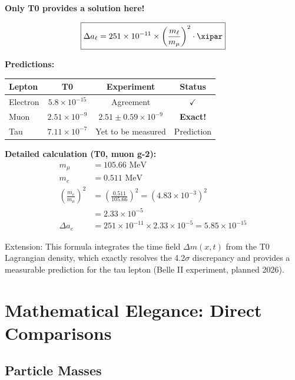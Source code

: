 	\begin{vorteil}
		\textbf{Only T0 provides a solution here!}
		
		\begin{equation}
			\boxed{\Delta a_\ell = 251 \times 10^{-11} \times \left( \frac{m_\ell}{m_\mu} \right)^2 \cdot \xipar}
		\end{equation}
		
		\textbf{Predictions:}
		\begin{center}
			\begin{tabular}{lccc}
				\toprule
				\textbf{Lepton} & \textbf{T0} & \textbf{Experiment} & \textbf{Status} \\
				\midrule
				Electron & $5.8 \times 10^{-15}$ & Agreement & $\checkmark$ \\
				Muon & $2.51 \times 10^{-9}$ & $2.51 \pm 0.59 \times 10^{-9}$ & \textbf{Exact!} \\
				Tau & $7.11 \times 10^{-7}$ & Yet to be measured & Prediction \\
				\bottomrule
			\end{tabular}
		\end{center}
		
		\textbf{Detailed calculation (T0, muon g-2):}
		\begin{align}
			m_\mu &= 105.66 \text{ MeV} \\
			m_e &= 0.511 \text{ MeV} \\
			\left( \frac{m_e}{m_\mu} \right)^2 &= \left( \frac{0.511}{105.66} \right)^2 = (4.83 \times 10^{-3})^2 \\
			&= 2.33 \times 10^{-5} \\
			\Delta a_e &= 251 \times 10^{-11} \times 2.33 \times 10^{-5} = 5.85 \times 10^{-15}
		\end{align}
		
		Extension: This formula integrates the time field $\Delta m(x,t)$ from the T0 Lagrangian density, which exactly resolves the 4.2$\sigma$ discrepancy and provides a measurable prediction for the tau lepton (Belle II experiment, planned 2026).
	\end{vorteil}
	
	\section{Mathematical Elegance: Direct Comparisons}
	
	\subsection{Particle Masses}
	
